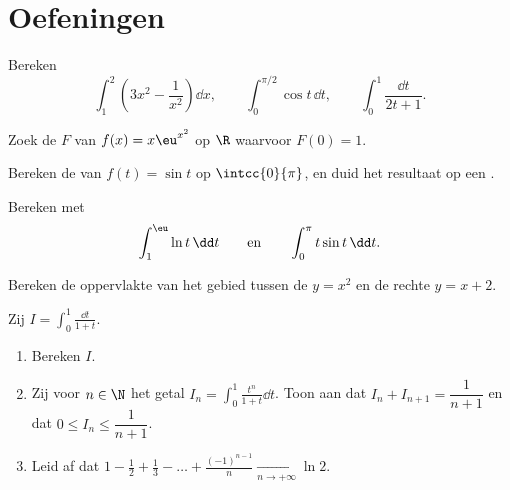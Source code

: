 \section{Oefeningen}

\begin{exercise}[$\star$]\label{exo:g12:integ:1}
Bereken
\[
\int_1^2 \left(3x^2 - \frac{1}{x^2}\right)\dd x, \qquad
\int_0^{\pi/2} \cos t \,\dd t, \qquad
\int_0^{1} \frac{\dd t}{2t+1} .
\]
\end{exercise}

\begin{exercise}[$\star$]\label{exo:g12:integ:2}
Zoek de  $F$ van $f(x) = x\eu^{x^2}$ op $\R$ waarvoor
$F(0) = 1$.
\end{exercise}

\begin{exercise}[$\star$]\label{exo:g12:integ:3}
Bereken de  van $f(t) = \sin t$ op $\intcc{0}{\pi}$, en duid
het resultaat op een .
\end{exercise}

\begin{exercise}[$\star\star$]\label{exo:g12:integ:4}
Bereken met 
\[
\int_1^{\eu} \ln t\,\dd t
\qquad\text{en}\qquad
\int_0^{\pi} t \sin t\,\dd t .
\]
\end{exercise}

\begin{exercise}[$\star\star$]\label{exo:g12:integ:5}
Bereken de oppervlakte van het gebied tussen de  $y = x^2$ en de
rechte $y = x + 2$.
\end{exercise}

\begin{exercise}[$\star\star$]\label{exo:g12:integ:6}
Zij $I = \displaystyle\int_0^1 \frac{\dd t}{1 + t}$.
\begin{enumerate}
  \item Bereken $I$.
  \item Zij voor $n \in \N$ het getal
        $I_n = \displaystyle\int_0^1 \frac{t^n}{1+t}\dd t$. Toon aan dat
        $I_n + I_{n+1} = \dfrac{1}{n+1}$ en dat
        $0 \leq I_n \leq \dfrac{1}{n+1}$.
  \item Leid af dat
        $1 - \frac12 + \frac13 - \dots + \frac{(-1)^{n-1}}{n}
        \xrightarrow[n \to +\infty]{} \ln 2$.
\end{enumerate}
\end{exercise}

